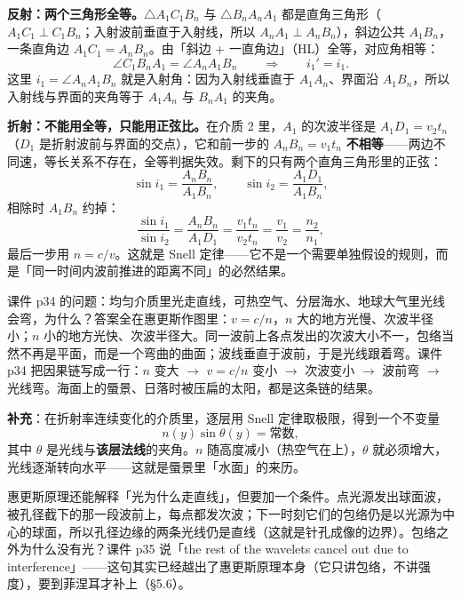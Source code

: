 \documentclass[11pt]{ctexart}
\begin{document}
\textbf{反射：两个三角形全等。}$\triangle A_1C_1B_n$ 与 $\triangle B_nA_nA_1$ 都是直角三角形（$A_1C_1\perp C_1B_n$；入射波前垂直于入射线，所以 $A_nA_1\perp A_nB_n$），斜边公共 $A_1B_n$，一条直角边 $A_1C_1=A_nB_n$。由「斜边 + 一直角边」（HL）全等，对应角相等：
\[
\angle C_1B_nA_1=\angle A_nA_1B_n
\qquad\Longrightarrow\qquad
i_1'=i_1 .
\]
这里 $i_1=\angle A_nA_1B_n$ 就是入射角：因为入射线垂直于 $A_1A_n$、界面沿 $A_1B_n$，所以入射线与界面的夹角等于 $A_1A_n$ 与 $B_nA_1$ 的夹角。

\textbf{折射：不能用全等，只能用正弦比。}在介质 2 里，$A_1$ 的次波半径是 $A_1D_1=v_2t_n$（$D_1$ 是折射波前与界面的交点），它和前一步的 $A_nB_n=v_1t_n$ \textbf{不相等}——两边不同速，等长关系不存在，全等判据失效。剩下的只有两个直角三角形里的正弦：
\[
\sin i_1=\frac{A_nB_n}{A_1B_n},
\qquad
\sin i_2=\frac{A_1D_1}{A_1B_n},
\]
相除时 $A_1B_n$ 约掉：
\[
\frac{\sin i_1}{\sin i_2}=\frac{A_nB_n}{A_1D_1}=\frac{v_1t_n}{v_2t_n}=\frac{v_1}{v_2}=\frac{n_2}{n_1},
\]
最后一步用 $n=c/v$。这就是 Snell 定律——它不是一个需要单独假设的规则，而是「同一时间内波前推进的距离不同」的必然结果。


课件 p34 的问题：均匀介质里光走直线，可热空气、分层海水、地球大气里光线会弯，为什么？答案全在惠更斯作图里：$v=c/n$，$n$ 大的地方光慢、次波半径小；$n$ 小的地方光快、次波半径大。同一波前上各点发出的次波大小不一，包络当然不再是平面，而是一个弯曲的曲面；波线垂直于波前，于是光线跟着弯。课件 p34 把因果链写成一行：$n$ 变大 $\rightarrow$ $v=c/n$ 变小 $\rightarrow$ 次波变小 $\rightarrow$ 波前弯 $\rightarrow$ 光线弯。海面上的蜃景、日落时被压扁的太阳，都是这条链的结果。

\textbf{补充}：在折射率连续变化的介质里，逐层用 Snell 定律取极限，得到一个不变量
\[
n(y)\sin\theta(y)=\text{常数},
\]
其中 $\theta$ 是光线与\textbf{该层法线}的夹角。$n$ 随高度减小（热空气在上），$\theta$ 就必须增大，光线逐渐转向水平——这就是蜃景里「水面」的来历。

惠更斯原理还能解释「光为什么走直线」，但要加一个条件。点光源发出球面波，被孔径截下的那一段波前上，每点都发次波；下一时刻它们的包络仍是以光源为中心的球面，所以孔径边缘的两条光线仍是直线（这就是针孔成像的边界）。包络之外为什么没有光？课件 p35 说「the rest of the wavelets cancel out due to interference」——这句其实已经越出了惠更斯原理本身（它只讲包络，不讲强度），要到菲涅耳才补上（§5.6）。
\end{document}
